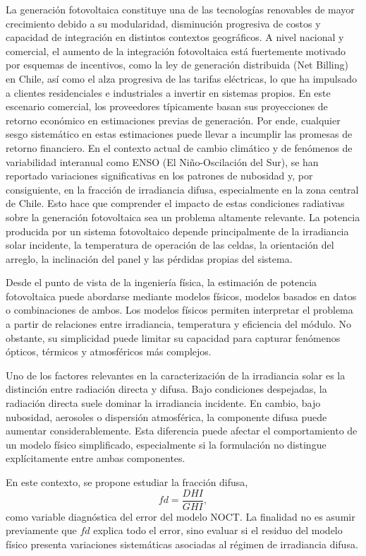 \documentclass[12pt, letterpaper]{article}
\begin{document}
La generación fotovoltaica constituye una de las tecnologías renovables de mayor crecimiento debido a su modularidad, disminución progresiva de costos y capacidad de integración en distintos contextos geográficos. A nivel nacional y comercial, el aumento de la integración fotovoltaica está fuertemente motivado por esquemas de incentivos, como la ley de generación distribuida (Net Billing) en Chile, así como el alza progresiva de las tarifas eléctricas, lo que ha impulsado a clientes residenciales e industriales a invertir en sistemas propios. En este escenario comercial, los proveedores típicamente basan sus proyecciones de retorno económico en estimaciones previas de generación. Por ende, cualquier sesgo sistemático en estas estimaciones puede llevar a incumplir las promesas de retorno financiero. En el contexto actual de cambio climático y de fenómenos de variabilidad interanual como ENSO (El Niño-Oscilación del Sur), se han reportado variaciones significativas en los patrones de nubosidad y, por consiguiente, en la fracción de irradiancia difusa, especialmente en la zona central de Chile. Esto hace que comprender el impacto de estas condiciones radiativas sobre la generación fotovoltaica sea un problema altamente relevante. La potencia producida por un sistema fotovoltaico depende principalmente de la irradiancia solar incidente, la temperatura de operación de las celdas, la orientación del arreglo, la inclinación del panel y las pérdidas propias del sistema.

Desde el punto de vista de la ingenier\'ia f\'isica, la estimaci\'on de potencia fotovoltaica puede abordarse mediante modelos f\'isicos, modelos basados en datos o combinaciones de ambos. Los modelos f\'isicos permiten interpretar el problema a partir de relaciones entre irradiancia, temperatura y eficiencia del m\'odulo. No obstante, su simplicidad puede limitar su capacidad para capturar fen\'omenos \'opticos, t\'ermicos y atmosf\'ericos m\'as complejos.

Uno de los factores relevantes en la caracterizaci\'on de la irradiancia solar es la distinci\'on entre radiaci\'on directa y difusa. Bajo condiciones despejadas, la radiaci\'on directa suele dominar la irradiancia incidente. En cambio, bajo nubosidad, aerosoles o dispersi\'on atmosf\'erica, la componente difusa puede aumentar considerablemente. Esta diferencia puede afectar el comportamiento de un modelo f\'isico simplificado, especialmente si la formulaci\'on no distingue expl\'icitamente entre ambas componentes.

En este contexto, se propone estudiar la fracci\'on difusa,
\[
    fd = \frac{DHI}{GHI},
\]
como variable diagn\'ostica del error del modelo NOCT. La finalidad no es asumir previamente que \(fd\) explica todo el error, sino evaluar si el residuo del modelo f\'isico presenta variaciones sistem\'aticas asociadas al r\'egimen de irradiancia difusa.
\end{document}
